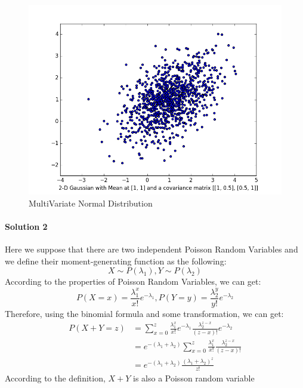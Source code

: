 \documentclass[paper=a4, fontsize=11pt]{scrartcl} %
\numberwithin{equation}{section} %
\numberwithin{figure}{section} %
\numberwithin{table}{section} %
\begin{document}
\begin{itemize}
\begin{figure}
 		\includegraphics[scale=0.6]{MultiVariateNormal.png}
 		\caption{MultiVariate Normal Distribution}
 		\label{fig:multiVariate}
 	\end{figure}
\end{itemize}


\paragraph{\textbf{Solution 2}}
Here we suppose that there are two independent Poisson Random Variables and we define their moment-generating function as the following:
\begin{equation*}
X\sim P(\lambda _{1}), Y\sim P(\lambda _{2})
\end{equation*}
According to the properties of Poisson Random Variables, we can get:
\begin{equation*}
P\left ( X=x \right )= \frac{\lambda _{1}^{x}}{x!}e^{-\lambda _{1}}, P\left ( Y=y \right )= \frac{\lambda _{2}^{y}}{y!}e^{-\lambda _{2}}
\end{equation*}
Therefore, using the binomial formula and some transformation, we can get:
\begin{align*}
P\left ( X+Y=z \right )&= \sum_{x=0}^{z}\frac{\lambda _{1}^{x}}{x!}e^{-\lambda _{1}}\frac{\lambda _{2}^{z-x}}{\left ( z-x \right )!}e^{-\lambda _{2}}
\\ &=e^{-\left (\lambda _{1}+\lambda _{2} \right )}\sum_{x=0}^{z}\frac{\lambda _{1}^{x}}{x!}\frac{\lambda _{2}^{z-x}}{\left (z-x  \right )!}
\\ &=e^{-\left (\lambda _{1}+\lambda _{2} \right )}\frac{\left (\lambda _{1}+\lambda _{2}  \right )^{z}}{z!}
\end{align*}
According to the definition, $X+Y$ is also a Poisson random variable
\end{document}
